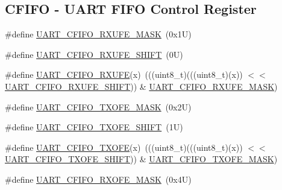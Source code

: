 \subsection*{C\+F\+I\+FO -\/ U\+A\+RT F\+I\+FO Control Register}
\begin{DoxyCompactItemize}
\item 
\#define \mbox{\hyperlink{group___u_a_r_t___register___masks_ga42bfb17cbfc685358f621e71f35225af}{U\+A\+R\+T\+\_\+\+C\+F\+I\+F\+O\+\_\+\+R\+X\+U\+F\+E\+\_\+\+M\+A\+SK}}~(0x1\+U)
\item 
\#define \mbox{\hyperlink{group___u_a_r_t___register___masks_ga9d089a8ed91922d0da34a362a29a2bd5}{U\+A\+R\+T\+\_\+\+C\+F\+I\+F\+O\+\_\+\+R\+X\+U\+F\+E\+\_\+\+S\+H\+I\+FT}}~(0\+U)
\item 
\#define \mbox{\hyperlink{group___u_a_r_t___register___masks_gaebc839c68c50cd87376700f11d84efd6}{U\+A\+R\+T\+\_\+\+C\+F\+I\+F\+O\+\_\+\+R\+X\+U\+FE}}(x)~(((uint8\+\_\+t)(((uint8\+\_\+t)(x)) $<$$<$ \mbox{\hyperlink{group___u_a_r_t___register___masks_ga9d089a8ed91922d0da34a362a29a2bd5}{U\+A\+R\+T\+\_\+\+C\+F\+I\+F\+O\+\_\+\+R\+X\+U\+F\+E\+\_\+\+S\+H\+I\+FT}})) \& \mbox{\hyperlink{group___u_a_r_t___register___masks_ga42bfb17cbfc685358f621e71f35225af}{U\+A\+R\+T\+\_\+\+C\+F\+I\+F\+O\+\_\+\+R\+X\+U\+F\+E\+\_\+\+M\+A\+SK}})
\item 
\#define \mbox{\hyperlink{group___u_a_r_t___register___masks_gac0d4e861e21453eecfc55ae37c97262d}{U\+A\+R\+T\+\_\+\+C\+F\+I\+F\+O\+\_\+\+T\+X\+O\+F\+E\+\_\+\+M\+A\+SK}}~(0x2\+U)
\item 
\#define \mbox{\hyperlink{group___u_a_r_t___register___masks_ga10885c0219ee82009a9041c1018e205c}{U\+A\+R\+T\+\_\+\+C\+F\+I\+F\+O\+\_\+\+T\+X\+O\+F\+E\+\_\+\+S\+H\+I\+FT}}~(1\+U)
\item 
\#define \mbox{\hyperlink{group___u_a_r_t___register___masks_ga77202250a663019c206a9d329a903fa2}{U\+A\+R\+T\+\_\+\+C\+F\+I\+F\+O\+\_\+\+T\+X\+O\+FE}}(x)~(((uint8\+\_\+t)(((uint8\+\_\+t)(x)) $<$$<$ \mbox{\hyperlink{group___u_a_r_t___register___masks_ga10885c0219ee82009a9041c1018e205c}{U\+A\+R\+T\+\_\+\+C\+F\+I\+F\+O\+\_\+\+T\+X\+O\+F\+E\+\_\+\+S\+H\+I\+FT}})) \& \mbox{\hyperlink{group___u_a_r_t___register___masks_gac0d4e861e21453eecfc55ae37c97262d}{U\+A\+R\+T\+\_\+\+C\+F\+I\+F\+O\+\_\+\+T\+X\+O\+F\+E\+\_\+\+M\+A\+SK}})
\item 
\#define \mbox{\hyperlink{group___u_a_r_t___register___masks_gae389d1934b5154ee403e78e80553e003}{U\+A\+R\+T\+\_\+\+C\+F\+I\+F\+O\+\_\+\+R\+X\+O\+F\+E\+\_\+\+M\+A\+SK}}~(0x4\+U)
\item 

\end{DoxyCompactItemize}
